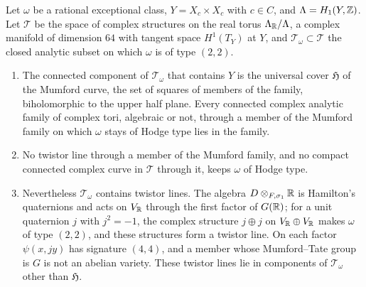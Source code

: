 \begin{proposition}\label{prop:notwistor}
Let $\omega$ be a rational exceptional class, $Y=X_{c}\times X_{c}$ with
$c\in C$, and $\Lambda=H_{1}(Y,\mathbb{Z})$. Let $\mathcal{T}$ be the space of
complex structures on the real torus $\Lambda_{\mathbb{R}}/\Lambda$, a complex
manifold of dimension $64$ with tangent space $H^{1}(T_{Y})$ at $Y$, and
$\mathcal{T}_{\omega}\subset\mathcal{T}$ the closed analytic subset on which
$\omega$ is of type $(2,2)$.
\begin{enumerate}[label=\textup{(\roman*)},leftmargin=2.6em,itemsep=2pt]
\item The connected component of $\mathcal{T}_{\omega}$ that contains $Y$ is
  the universal cover $\mathfrak{H}$ of the Mumford curve, the set of
  squares of members of the family, biholomorphic to the upper half plane.
  Every connected complex analytic family of complex tori, algebraic or not,
  through a member of the Mumford family on which $\omega$ stays of Hodge
  type lies in the family.
\item No twistor line through a member of the Mumford family, and no compact
  connected complex curve in $\mathcal{T}$ through it, keeps $\omega$ of
  Hodge type.
\item Nevertheless $\mathcal{T}_{\omega}$ contains twistor lines. The algebra
  $D\otimes_{F,\sigma_{1}}\mathbb{R}$ is Hamilton's quaternions and acts on
  $V_{\mathbb{R}}$ through the first factor of $G(\mathbb{R})$; for a unit quaternion $j$
  with $j^{2}=-1$, the complex structure $j\oplus j$ on $V_{\mathbb{R}}\oplus
  V_{\mathbb{R}}$ makes $\omega$ of type $(2,2)$, and these structures form a twistor
  line. On each factor $\psi(x,jy)$ has signature $(4,4)$, and a member whose
  Mumford--Tate group is $G$ is not an abelian variety. These twistor lines
  lie in components of $\mathcal{T}_{\omega}$ other than $\mathfrak{H}$.
\end{enumerate}
\end{proposition}

